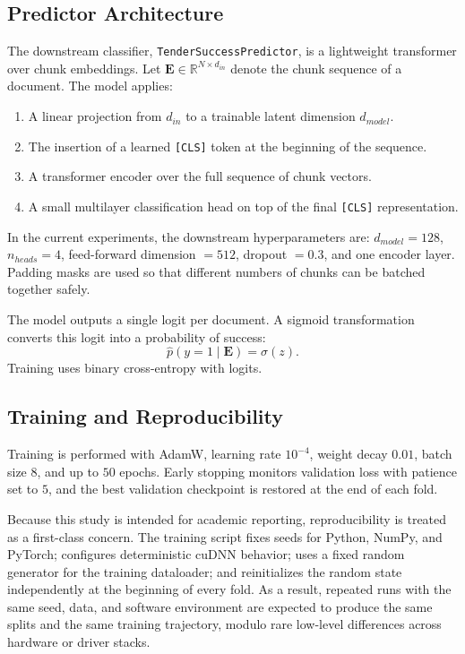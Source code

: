 \documentclass[conference]{IEEEtran}
\begin{document}
\subsection{Predictor Architecture}
The downstream classifier, \texttt{TenderSuccessPredictor}, is a lightweight transformer over chunk embeddings. Let $\mathbf{E} \in \mathbb{R}^{N \times d_{in}}$ denote the chunk sequence of a document. The model applies:

\begin{enumerate}
  \item A linear projection from $d_{in}$ to a trainable latent dimension $d_{model}$.
  \item The insertion of a learned \texttt{[CLS]} token at the beginning of the sequence.
  \item A transformer encoder over the full sequence of chunk vectors.
  \item A small multilayer classification head on top of the final \texttt{[CLS]} representation.
\end{enumerate}

In the current experiments, the downstream hyperparameters are: $d_{model}=128$, $n_{heads}=4$, feed-forward dimension $=512$, dropout $=0.3$, and one encoder layer. Padding masks are used so that different numbers of chunks can be batched together safely.

The model outputs a single logit per document. A sigmoid transformation converts this logit into a probability of success:
\[
\hat{p}(y=1 \mid \mathbf{E}) = \sigma(z).
\]
Training uses binary cross-entropy with logits.

\subsection{Training and Reproducibility}
Training is performed with AdamW, learning rate $10^{-4}$, weight decay $0.01$, batch size $8$, and up to $50$ epochs. Early stopping monitors validation loss with patience set to $5$, and the best validation checkpoint is restored at the end of each fold.

Because this study is intended for academic reporting, reproducibility is treated as a first-class concern. The training script fixes seeds for Python, NumPy, and PyTorch; configures deterministic cuDNN behavior; uses a fixed random generator for the training dataloader; and reinitializes the random state independently at the beginning of every fold. As a result, repeated runs with the same seed, data, and software environment are expected to produce the same splits and the same training trajectory, modulo rare low-level differences across hardware or driver stacks.
\end{document}
